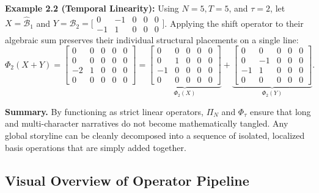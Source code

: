 \documentclass[sigconf,review,anonymous]{acmart}
\newcommand{\calB}{\mathcal{B}}
\begin{document}
\noindent\textbf{Example 2.2 (Temporal Linearity):} Using $N=5, T=5$, and $\tau=2$, let $X = \hat{\calB}_1$ and $Y = \hat{\calB}_2 = \bigl[\begin{smallmatrix} 0 & -1 & 0 & 0 & 0 \\ -1 & 1 & 0 & 0 & 0 \end{smallmatrix}\bigr]$. Applying the shift operator to their algebraic sum preserves their individual structural placements on a single line:
\begin{equation}
    \Phi_2(X + Y) =
    \left[\begin{smallmatrix}
         0 &  0 & 0 & 0 & 0 \\
         0 &  0 & 0 & 0 & 0 \\
        -2 &  1 & 0 & 0 & 0 \\
         0 &  0 & 0 & 0 & 0
    \end{smallmatrix}\right] =
    \underbrace{\left[\begin{smallmatrix}
         0 &  0 & 0 & 0 & 0 \\
         0 &  1 & 0 & 0 & 0 \\
        -1 &  0 & 0 & 0 & 0 \\
         0 &  0 & 0 & 0 & 0
    \end{smallmatrix}\right]}_{\Phi_2(X)}
    +
    \underbrace{\left[\begin{smallmatrix}
         0 &  0 & 0 & 0 & 0 \\
         0 & -1 & 0 & 0 & 0 \\
        -1 &  1 & 0 & 0 & 0 \\
         0 &  0 & 0 & 0 & 0
    \end{smallmatrix}\right]}_{\Phi_2(Y)}.
\end{equation}

\noindent \textbf{Summary.} By functioning as strict linear operators, $\Pi_N$ and $\Phi_\tau$ ensure that long and multi-character narratives do not become mathematically tangled. Any global storyline can be cleanly decomposed into a sequence of isolated, localized basis operations that are simply added together.




\subsection{Visual Overview of Operator Pipeline}
\end{document}

